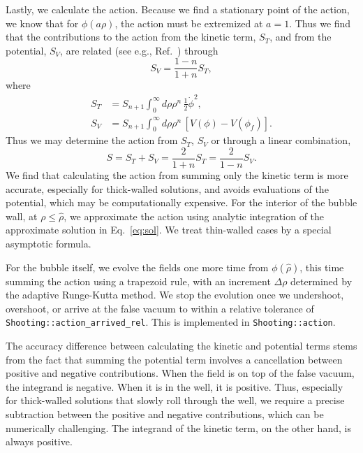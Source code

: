 \documentclass[final,3p,11pt,pdflatex]{elsarticle}
\renewcommand{\tfrac}{\frac}
\newcommand{\code}[1]{\ifmmode\text{\nolinkurl{#1}}\else\nolinkurl{#1}\fi}
\renewcommand{\refeq}[1]{Eq.~\ref{#1}}
\newcommand{\refcite}[1]{Ref.~\cite{#1}}
\newcommand{\fv}{\ensuremath{\phi_f}}
\begin{document}
Lastly, we calculate the action.  Because we find a stationary point of the action, we know that for $\phi(a\rho)$, the action must be extremized at $a=1$.  Thus we find that the contributions to the action from the kinetic term, $S_T$, and from the potential, $S_V$, are related (see e.g., \refcite{Masoumi:2016wot}) through
\begin{equation}
S_V = \frac{1 - n}{1 + n} S_T,
\end{equation}
where
\begin{align}
S_T &= S_{n + 1} \int_0^\infty d\rho \rho^n \, \tfrac12\dot\phi^2, \label{eq:kinetic_action}\\
S_V &= S_{n + 1} \int_0^\infty d\rho \rho^n \, \left[V(\phi) - V(\fv) \right].
\end{align}
Thus we may determine the action from $S_T$, $S_V$ or through a linear combination,
\begin{equation}
S = S_T + S_V = \frac{2}{1 + n} S_T = \frac{2}{1 - n} S_V.
\end{equation}
We find that calculating the action from summing only the kinetic term is more accurate,
especially for thick-walled solutions, and avoids evaluations of the potential,
which may be computationally expensive.  For the interior of the bubble wall,
at $\rho \le \hat\rho$, we approximate the action using analytic integration
of the approximate solution in \refeq{eq:sol}.  We treat thin-walled cases by
a special asymptotic formula.

For the bubble itself, we evolve the fields one more time from $\phi(\hat\rho)$,
this time summing the action using a trapezoid rule, with an increment
$\Delta\rho$ determined by the adaptive Runge-Kutta method.  We stop the
evolution once we undershoot, overshoot, or arrive at the false vacuum to within
a relative tolerance of \code{Shooting::action_arrived_rel}.  This is implemented
in \code{Shooting::action}.

The accuracy difference between calculating the kinetic and potential terms stems from the fact that summing the potential term involves
a cancellation between positive and negative contributions.  When the field
is on top of the false vacuum, the integrand is negative.  When it is in the
well, it is positive.  Thus, especially for thick-walled solutions that slowly roll through the well, we require a precise subtraction
between the positive and negative contributions, which can be numerically challenging. The integrand of the
kinetic term, on the other hand, is always positive.
\end{document}
